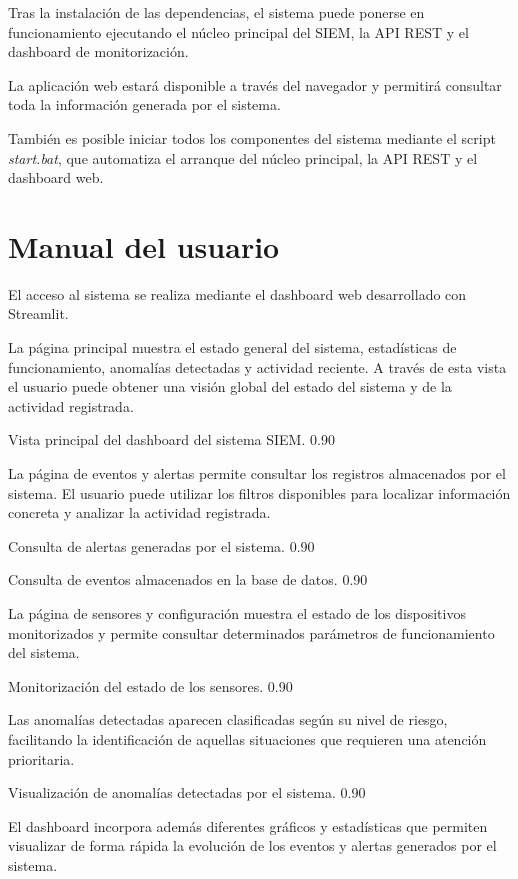 Tras la instalación de las dependencias, el sistema puede ponerse en funcionamiento ejecutando el núcleo principal del SIEM, la API REST y el dashboard de monitorización.

La aplicación web estará disponible a través del navegador y permitirá consultar toda la información generada por el sistema.

También es posible iniciar todos los componentes del sistema mediante el script \textit{start.bat}, que automatiza el arranque del núcleo principal, la API REST y el dashboard web.

\section{Manual del usuario}

El acceso al sistema se realiza mediante el dashboard web desarrollado con Streamlit.

La página principal muestra el estado general del sistema, estadísticas de funcionamiento, anomalías detectadas y actividad reciente. A través de esta vista el usuario puede obtener una visión global del estado del sistema y de la actividad registrada.

{Vista principal del dashboard del sistema SIEM.}
{0.90}

La página de eventos y alertas permite consultar los registros almacenados por el sistema. El usuario puede utilizar los filtros disponibles para localizar información concreta y analizar la actividad registrada.

{Consulta de alertas generadas por el sistema.}
{0.90}

{Consulta de eventos almacenados en la base de datos.}
{0.90}

La página de sensores y configuración muestra el estado de los dispositivos monitorizados y permite consultar determinados parámetros de funcionamiento del sistema.

{Monitorización del estado de los sensores.}
{0.90}

Las anomalías detectadas aparecen clasificadas según su nivel de riesgo, facilitando la identificación de aquellas situaciones que requieren una atención prioritaria.

{Visualización de anomalías detectadas por el sistema.}
{0.90}

El dashboard incorpora además diferentes gráficos y estadísticas que permiten visualizar de forma rápida la evolución de los eventos y alertas generados por el sistema.

